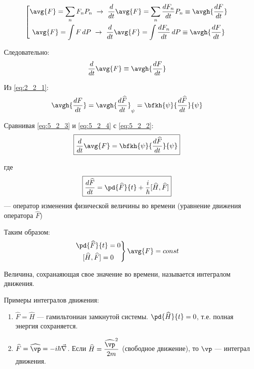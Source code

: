 $$
\left[
\begin{gathered}
\avg{F} = \sum_n F_n P_n ~\rightarrow~ \frac{d}{dt}\avg{F}=\sum_n \frac{dF_n}{dt}P_n \equiv \avgh{\frac{dF}{dt}}\\
\avg{F} = \int F\,dP ~\rightarrow~ \frac{d}{dt}\avg{F}=\int \frac{dF_n}{dt}\,dP \equiv \avgh{\frac{dF}{dt}}\\
\end{gathered}
\right.
$$

Следовательно:
\begin{equation}
\label{eq:5_2_3}
\frac{d}{dt} \avg{F} \equiv \avgh{\frac{dF}{dt}}
\end{equation}

Из \eqref{eq:2_2_1}:
\begin{equation}
\label{eq:5_2_4}
\avgh{\frac{dF}{dt}} = \avgh{\frac{d \widehat{F}}{dt}}_{\psi} = \bfkh{\psi}{\frac{d \widehat{F}}{dt}}{\psi}
\end{equation}

Сравнивая \eqref{eq:5_2_3} и \eqref{eq:5_2_4} с \eqref{eq:5_2_2}:
\begin{equation}
\label{eq:5_2_5}
\boxed{\frac{d}{dt} \avg{F} = \bfkh{\psi}{\frac{d \widehat{F}}{dt}}{\psi}}
\end{equation}

где
\begin{equation}
\label{eq:5_2_6}
\boxed{\frac{d\widehat{F}}{dt} = \pd{\widehat{F}}{t} + \frac{i}{\hbar} [\widehat{H}, \widehat{F}]}
\end{equation}
--- оператор изменения физической величины во времени (уравнение движения оператора $\widehat{F}$)

Таким образом:
$$
\left.
\begin{gathered}
\pd{\widehat{F}}{t}=0 \\
[\widehat{H}, \widehat{F}]=0
\end{gathered}
\right\} \avg{F}=const
$$

\begin{defn}
Величина, сохранаяющая свое значение во времени, называется интегралом движения.
\end{defn}

Примеры интегралов движения:
\begin{enumerate}
\item $\widehat{F} = \widehat{H}$ --- гамильтониан замкнутой системы. $\pd{\widehat{H}}{t}=0$, т.е. полная энергия сохраняется.
\item $\widehat{F} = \widehat{\vp} = - i \hbar \vec{\nabla}$.  Если $\displaystyle\widehat{H} = \frac{\widehat{\vp}^2}{2m}$ (свободное движение), то $\vp$ --- интеграл движения.
\end{enumerate}

